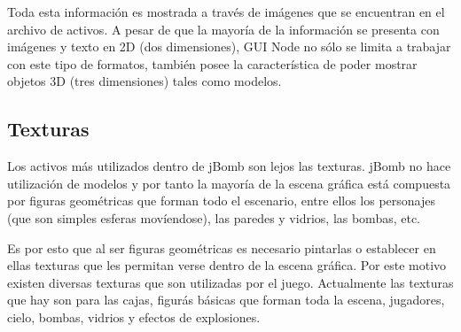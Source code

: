 \documentclass[a4paper,12pt,openany,oneside]{book}
\begin{document}
Toda esta información es mostrada a través de imágenes que se encuentran en el archivo de activos. A pesar de que la mayoría de la información se presenta con imágenes y texto en 2D (dos dimensiones), GUI Node no sólo se limita a trabajar con este tipo de formatos, también posee la característica de poder mostrar objetos 3D (tres dimensiones) tales como modelos.
\subsection{Texturas}
Los activos más utilizados dentro de jBomb son lejos las texturas. jBomb no hace utilización de modelos y por tanto la mayoría de la escena gráfica está compuesta por figuras geométricas que forman todo el escenario, entre ellos los personajes (que son simples esferas movíendose), las paredes y vidrios, las bombas, etc.

Es por esto que al ser figuras geométricas es necesario pintarlas o establecer en ellas texturas que les permitan verse dentro de la escena gráfica. Por este motivo existen diversas texturas que son utilizadas por el juego. Actualmente las texturas que hay son para las cajas, figurás básicas que forman toda la escena, jugadores, cielo, bombas, vidrios y efectos de explosiones.
\end{document}
